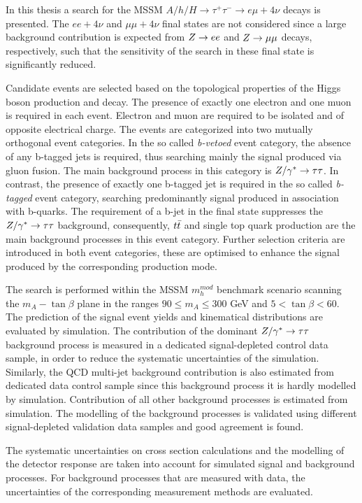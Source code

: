 In this thesis a search for the MSSM 
$A/h/H \rightarrow \tau^+ \tau^- \rightarrow e \mu +4\nu$ decays is presented. The $ee +4\nu$ and $\mu\mu +4\nu$ final states 
are not considered since a large background contribution is  expected  from $Z\rightarrow ee$ and $Z\rightarrow \mu\mu$ decays,  respectively, such that the sensitivity of the search in these final
state is significantly reduced.

Candidate events are selected based on the topological properties of the Higgs boson production
and decay. The  presence of exactly one electron and one muon is required in each event. Electron and muon are required to be 
 isolated and of opposite electrical charge.
The  events are categorized into two mutually orthogonal event categories. In the so called  \emph{b-vetoed} event category,
the absence of any b-tagged jets is required, thus searching mainly the signal produced via gluon fusion. The main background 
process in  this category is $Z/\gamma^*\rightarrow \tau\tau$. 
In contrast, the presence of exactly one  b-tagged jet is required in the so called \emph{b-tagged} event category, 
searching predominantly signal produced in association with b-quarks. The requirement of a b-jet 
in the final state suppresses the $Z/\gamma^*\rightarrow \tau\tau$ background, consequently, $t\bar{t}$ and single top quark  production
are the main background processes in this event category. Further selection criteria are introduced in both event categories, 
these are optimised to enhance the signal produced by the corresponding production mode.

The  search is performed within the MSSM $m_h^{mod}$ benchmark scenario
scanning the $m_A - \tan\beta$ plane in the ranges $90 \leq m_A \leq 300$ GeV and $5 < \tan\beta < 60$.
The prediction of the signal event yields and kinematical distributions are evaluated by simulation.
The contribution of the dominant $Z/\gamma^*\rightarrow \tau\tau$ background process is measured in a dedicated  signal-depleted control data sample,
in order to reduce the systematic uncertainties of the simulation. Similarly, the QCD multi-jet background contribution 
is also estimated from dedicated data control sample since this background process it is hardly modelled by simulation.
Contribution of  all  other background processes  is estimated from simulation.
The modelling of the background processes is  validated using different signal-depleted validation data samples and
good agreement is found.

The systematic uncertainties  on cross section calculations and the modelling of the detector response are
taken into account for simulated signal and background processes. For background processes  that are measured with  data,
the uncertainties of the corresponding measurement methods are evaluated.

